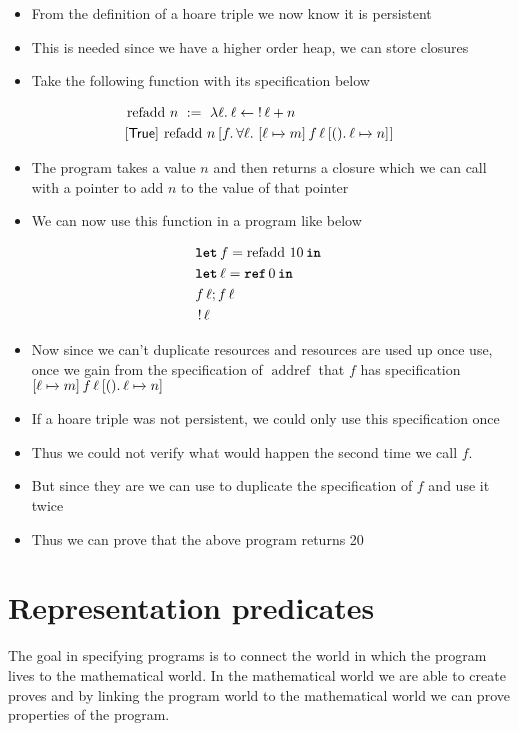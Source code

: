 \documentclass[thesis.tex]{subfiles}
\begin{document}
\begin{itemize}
  \item From the definition of a hoare triple we now know it is persistent
  \item This is needed since we have a higher order heap, we can store closures
  \item Take the following function with its specification below
\end{itemize}
\begin{align*}
   & \operatorname{refadd}\, n\ :=\ \Lam \loc. \loc \gets \deref \loc + n                                                          \\
   & \hoare{\TRUE}{\operatorname{refadd}\, n}{\Ret f. {\forall \loc.\ \hoare{\loc \fmapsto m}{f\, \loc}{\Ret (). \loc\fmapsto n}}}
\end{align*}
\begin{itemize}
  \item The program takes a value $n$ and then returns a closure which we can call with a pointer to add $n$ to the value of that pointer
  \item We can now use this function in a program like below
\end{itemize}
\begin{align*}
   & \Let f = \operatorname{refadd}\, 10 in \\
   & \Let \loc = \Alloc 0 in                \\
   & f\, \loc; f\, \loc                     \\
   & \deref \loc
\end{align*}
\begin{itemize}
  \item Now since we can't duplicate resources and resources are used up once use, once we gain from the specification of $\operatorname{addref}$ that $f$ has specification $\hoare{\loc \fmapsto m}{f\, \loc}{\Ret (). \loc\fmapsto n}$
  \item If a hoare triple was not persistent, we could only use this specification once
  \item Thus we could not verify what would happen the second time we call $f$.
  \item But since they are we can use  to duplicate the specification of $f$ and use it twice
  \item Thus we can prove that the above program returns 20
\end{itemize}
\section{Representation predicates}
\label{sec:represpreds}
The goal in specifying programs is to connect the world in which the program lives to the mathematical world. In the mathematical world we are able to create proves and by linking the program world to the mathematical world we can prove properties of the program. 
\end{document}
